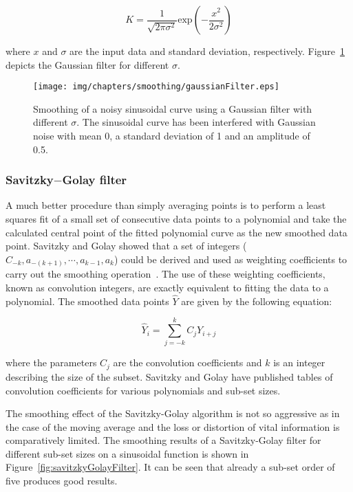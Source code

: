 \begin{equation}
	K = \frac{1}{\sqrt{2\pi\sigma^2}}\text{exp}\left(-\frac{x^2}{2\sigma^2}\right)
\label{eq:gaussianFilterKernel}
\end{equation}

where $x$ and $\sigma$ are the input data and standard deviation, respectively. Figure~\ref{img:gaussianFilter} depicts the Gaussian filter for different $\sigma$.

\begin{figure}[htb]
   \centering   
   \texttt{[image: img/chapters/smoothing/gaussianFilter.eps]}
   \caption[Gaussian filter smoothing]{Smoothing of a noisy sinusoidal curve using a Gaussian filter with different $\sigma$. The sinusoidal curve has been interfered with Gaussian noise with mean 0, a standard deviation of 1 and an amplitude of 0.5.}
   \label{img:gaussianFilter}
\end{figure}  

\subsubsection{Savitzky$-$Golay filter}
A much better procedure than simply averaging points is to perform a least squares fit of a small set of consecutive data points to a polynomial and take the calculated central point of the fitted polynomial curve as the new smoothed data point. Savitzky and Golay showed that a set of integers ($C_{-k}, a_{-(k+1)}, \cdots, a_{k-1}, a_{k}$) could be derived and used as weighting coefficients to carry out the smoothing operation~\cite{Savitzky1964}. The use of these weighting coefficients, known as convolution integers, are exactly equivalent to fitting the data to a polynomial. The smoothed data points $\hat{Y}$ are given by the following equation:

\begin{equation}
	\hat{Y}_{i} = \sum\limits_{j=-k}^{k}{C_{j}Y_{i+j}}
\label{eq:savitzkyGolayFilter}
\end{equation} 

where the parameters $C_{j}$ are the convolution coefficients and $k$ is an integer describing the size of the subset. Savitzky and Golay have published tables of convolution coefficients for various polynomials and sub-set sizes. 

The smoothing effect of the Savitzky-Golay algorithm is not so aggressive as in the case of the moving average and the loss or distortion of vital information is comparatively limited. The smoothing results of a Savitzky-Golay filter for  different sub-set sizes on a sinusoidal function is shown in Figure~\ref{fig:savitzkyGolayFilter}. It can be seen that already a sub-set order of five produces good results. 

